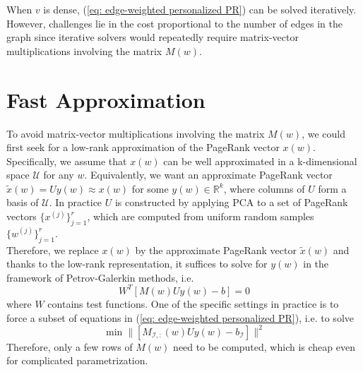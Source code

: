 \documentclass[a4paper, 11pt]{article}
\begin{document}
When $v$ is dense, (\ref{eq: edge-weighted personalized PR}) can be solved iteratively. However, challenges lie in the cost proportional to the number of edges in the graph since iterative solvers would repeatedly require matrix-vector multiplications involving the matrix $M(w)$. \\ 

\section{Fast Approximation}
To avoid matrix-vector multiplications involving the matrix $M(w)$, we could first seek for a low-rank approximation of the PageRank vector $x(w)$. Specifically, we assume that $x(w)$ can be well approximated in a k-dimensional space $\mathcal{U}$ for any $w$. Equivalently, we want an approximate PageRank vector $\tilde{x}(w) = Uy(w) \approx x(w)$ for some $y(w) \in \mathbb{R}^{k}$, where columns of $U$ form a basis of $\mathcal{U}$. In practice $U$ is constructed by applying PCA to a set of PageRank vectors $\{x^{(j)}\}_{j=1}^r$, which are computed from uniform random samples $\{w^{(j)}\}_{j=1}^r$. \\

Therefore, we replace $x(w)$ by the approximate PageRank vector $\tilde{x}(w)$ and thanks to the low-rank representation, it suffices to solve for $y(w)$ in the framework of Petrov-Galerkin methods, i.e.
\begin{equation}\label{eq: systems for y, raw}
	W^T [M(w)Uy(w) - b] = 0
\end{equation}
where $W$ contains test functions. One of the specific settings in practice is to force a subset of equations in (\ref{eq: edge-weighted personalized PR}), i.e. to solve 
\begin{equation}\label{eq: reduced ls problem}
	\min \| [M_{\mathcal{I},:}(w)Uy(w) - b_{\mathcal{I}}]\|^2 
\end{equation}
Therefore, only a few rows of $M(w)$ need to be computed, which is cheap even for complicated parametrization. \\
\end{document}
